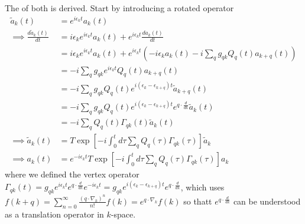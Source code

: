 \begin{tcolorbox}
The of both is derived. Start by introducing a rotated operator 
\begin{align}
    \tilde{a}_k(t)&=e^{i \epsilon_k t} a_k(t) \\
\implies \frac{d \tilde{a}_k(t)}{d t}&=i \epsilon_k e^{i \epsilon_k t} a_k(t)+e^{i \epsilon_k t} \frac{d a_k(t)}{d t} \\
&=i \epsilon_k e^{i \epsilon_k t} a_k(t)+e^{i \epsilon_k t}\left(-i \epsilon_k a_k(t)-i \sum_q g_{q k} Q_q(t) a_{k+q}(t)\right) \\
&=-i \sum_q g_{q k} e^{i \epsilon_k t} Q_q(t) a_{k+q}(t) \\
&=-i \sum_q g_{q k} Q_q(t) e^{i\left(\epsilon_k-\epsilon_{k+q}\right) t} \tilde{a}_{k+q}(t) \\
&=-i \sum_q g_{q k} Q_q(t) e^{i\left(\epsilon_k-\epsilon_{k+q}\right) t} e^{q \cdot \frac{d}{d k}} \tilde{a}_k(t) \\
&= -i \sum_q Q_q(t) \Gamma_{q k}(t) \tilde{a}_k(t) \\
\implies \tilde{a}_k(t)&=T \exp \left[-i \int_0^t d \tau \sum_q Q_q(\tau) \Gamma_{q k}(\tau)\right] \tilde{a}_k \\
\implies a_k(t)&=e^{-i \epsilon_k t} T \exp \left[-i \int_0^t d \tau \sum_q Q_q(\tau) \Gamma_{q k}(\tau)\right] a_k
\end{align}
where we defined the vertex operator $\Gamma_{q k}(t)=g_{q k} e^{i \epsilon_k t} e^{q \cdot \frac{d}{d k}} e^{-i \epsilon_k t} = g_{q k} e^{i\left(\epsilon_k-\epsilon_{k+q}\right) t} e^{q \cdot \frac{d}{d k}} $, which uses
$f(k+q)=\sum_{n=0}^{\infty} \frac{\left(q \cdot \nabla_k\right)^n}{n!} f(k)=e^{q \cdot \nabla_k} f(k)$ so thatt $e^{q \cdot \frac{d}{d k}}$ can be understood as a translation operator in $k$-space.
\end{tcolorbox}
